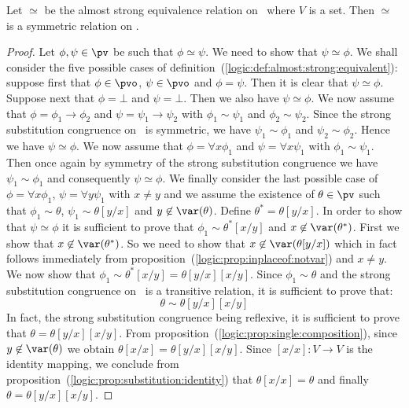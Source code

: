 \begin{prop}\label{logic:prop:almost:strong:symmetric}
Let $\simeq$ be the almost strong equivalence relation on \pv\ where
$V$ is a set. Then $\simeq$ is a symmetric relation on \pv.
\end{prop}
\begin{proof}
Let $\phi,\psi\in\pv$ be such that $\phi\simeq\psi$. We need to show that $\psi\simeq\phi$. We shall consider the five possible cases of definition~(\ref{logic:def:almost:strong:equivalent}): suppose first that $\phi\in\pvo$, $\psi\in\pvo$ and $\phi=\psi$. Then it is clear that $\psi\simeq\phi$. Suppose next that $\phi=\bot$ and $\psi=\bot$. Then we also have $\psi\simeq\phi$. We now assume that $\phi=\phi_{1}\to\phi_{2}$ and $\psi=\psi_{1}\to\psi_{2}$ with $\phi_{1}\sim\psi_{1}$ and $\phi_{2}\sim\psi_{2}$. Since the strong substitution congruence on \pv\ is symmetric, we have $\psi_{1}\sim\phi_{1}$ and $\psi_{2}\sim\phi_{2}$. Hence we have $\psi\simeq\phi$. We now assume that $\phi=\forall x\phi_{1}$ and $\psi=\forall x\psi_{1}$ with $\phi_{1}\sim\psi_{1}$. Then once again by symmetry of the strong substitution congruence we have $\psi_{1}\sim\phi_{1}$ and consequently $\psi\simeq\phi$. We finally consider the last possible case of $\phi=\forall x\phi_{1}$, $\psi=\forall y\psi_{1}$ with $x\neq y$ and we assume the existence of $\theta\in\pv$ such that $\phi_{1}\sim\theta$, $\psi_{1}\sim\theta[y/x]$ and $y\not\in\var(\theta)$. Define $\theta^{*}=\theta[y/x]$. In order to show that $\psi\simeq\phi$ it is sufficient to prove that $\phi_{1}\sim\theta^{*}[x/y]$ and $x\not\in\var(\theta^{*})$. First we show that $x\not\in\var(\theta^{*})$. So we need to show that $x\not\in\var(\theta[y/x])$ which in fact follows immediately from proposition~(\ref{logic:prop:inplaceof:notvar}) and $x\neq y$. We now show that $\phi_{1}\sim\theta^{*}[x/y]=\theta[y/x][x/y]$. Since $\phi_{1}\sim\theta$ and the strong substitution congruence on \pv\ is a transitive relation, it is sufficient to prove that:
    \[
    \theta\sim\theta[y/x][x/y]
    \]
In fact, the strong substitution congruence being reflexive, it is
sufficient to prove that $\theta=\theta[y/x][x/y]$. From
proposition~(\ref{logic:prop:single:composition}), since
$y\not\in\var(\theta)$ we obtain $\theta[x/x]=\theta[y/x][x/y]$.
Since $[x/x]:V\to V$ is the identity mapping, we conclude from
proposition~(\ref{logic:prop:substitution:identity}) that
$\theta[x/x]=\theta$ and finally $\theta=\theta[y/x][x/y]$.
\end{proof}


